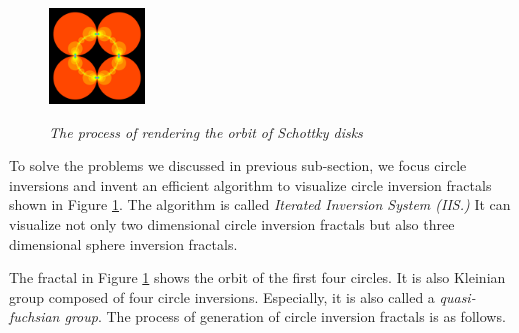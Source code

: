 \begin{figure}[htbp]
\begin{minipage}[t]{0.16\hsize}
  \subcaption{}
  \label{fig:level2}
 \end{minipage}
 \begin{minipage}[t]{0.16\hsize}
  \center
  \includegraphics[width=1in, height=1in, keepaspectratio]{img/preparation/orbit/levelMaxc.pdf}
  \subcaption{}
  \label{fig:levelMax}
 \end{minipage}
 \caption{\textit{The process of rendering the orbit of Schottky disks}}
 \label{fig:schottkyProcess}
\end{figure}

\noindent To solve the problems we discussed in previous sub-section,
we focus circle inversions and invent an efficient algorithm to
visualize circle inversion fractals shown in Figure \ref{fig:schottkyProcess}.
The algorithm is called \textit{Iterated Inversion System (IIS.)}
It can visualize not only two dimensional circle inversion fractals but
also three dimensional sphere inversion fractals.

The fractal in Figure \ref{fig:schottkyProcess} shows the orbit of the first
four circles. %
It is also Kleinian group composed of four circle inversions.
Especially, it is also called a \textit{quasi-fuchsian group}.
The process of generation of circle inversion fractals is
as follows.

